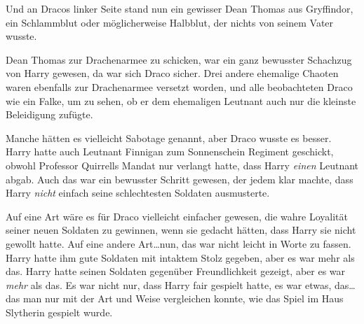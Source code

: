Und an Dracos linker Seite stand nun ein gewisser Dean Thomas aus Gryffindor, ein Schlammblut oder möglicherweise Halbblut, der nichts von seinem Vater wusste.

Dean Thomas zur Drachenarmee zu schicken, war ein ganz bewusster Schachzug von Harry gewesen, da war sich Draco sicher. Drei andere ehemalige Chaoten waren ebenfalls zur Drachenarmee versetzt worden, und alle beobachteten Draco wie ein Falke, um zu sehen, ob er dem ehemaligen Leutnant auch nur die kleinste Beleidigung zufügte.

Manche hätten es vielleicht Sabotage genannt, aber Draco wusste es besser. Harry hatte auch Leutnant Finnigan zum Sonnenschein Regiment geschickt, obwohl Professor Quirrells Mandat nur verlangt hatte, dass Harry \emph{einen} Leutnant abgab. Auch das war ein bewusster Schritt gewesen, der jedem klar machte, dass Harry \emph{nicht} einfach seine schlechtesten Soldaten ausmusterte.

Auf eine Art wäre es für Draco vielleicht einfacher gewesen, die wahre Loyalität seiner neuen Soldaten zu gewinnen, wenn sie gedacht hätten, dass Harry sie nicht gewollt hatte. Auf eine andere Art…nun, das war nicht leicht in Worte zu fassen. Harry hatte ihm gute Soldaten mit intaktem Stolz gegeben, aber es war mehr als das. Harry hatte seinen Soldaten gegenüber Freundlichkeit gezeigt, aber es war \emph{mehr} als das. Es war nicht nur, dass Harry fair gespielt hatte, es war etwas, das… das man nur mit der Art und Weise vergleichen konnte, wie das Spiel im Haus Slytherin gespielt wurde.

